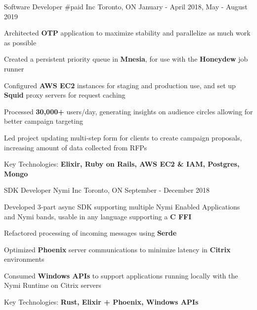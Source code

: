 

\begin{cventries}

  \cventry
    {Software Developer} %
    {\#paid Inc} %
    {Toronto, ON} %
    {January - April 2018, May - August 2019} %
    {
      \begin{cvitems} %
        \item {Architected \textbf{OTP} application to maximize stability and parallelize as much work as possible}
        \item {Created a persistent priority queue in \textbf{Mnesia}, for use with the \textbf{Honeydew} job runner}
        \item {Configured \textbf{AWS EC2} instances for staging and production use, and set up \textbf{Squid} proxy servers for request caching}
        \item {Processed \textbf{30,000+} users/day, generating insights on audience circles allowing for better campaign targeting}
        \item {Led project updating multi-step form for clients to create campaign proposals, increasing amount of data collected from RFPs}
        \item {Key Technologies: \textbf{Elixir, Ruby on Rails, AWS EC2 \& IAM, Postgres, Mongo}}
      \end{cvitems}
    }

  \cventry
    {SDK Developer} %
    {Nymi Inc} %
    {Toronto, ON} %
    {September - December 2018} %
    {
      \begin{cvitems} %
        \item {Developed 3-part async SDK supporting multiple Nymi Enabled Applications and Nymi bands, usable in any language supporting a \textbf{C FFI}}
        \item {Refactored processing of incoming messages using \textbf{Serde}}
        \item {Optimized \textbf{Phoenix} server communications to minimize latency in \textbf{Citrix} environments}
        \item {Consumed \textbf{Windows APIs} to support applications running locally with the Nymi Runtime on Citrix servers}
        \item {Key Technologies: \textbf{Rust, Elixir + Phoenix, Windows APIs}}
      \end{cvitems}
    }

\end{cventries}

